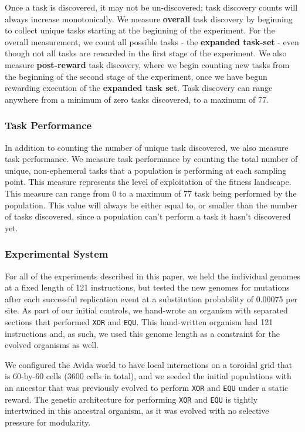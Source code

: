 \documentclass[10pt,letterpaper,final]{article}
\begin{document}
Once a task is discovered, it may not be un-discovered; task discovery counts will always increase monotonically. We measure \textbf{overall} task discovery by beginning to collect unique tasks starting at the beginning of the experiment. For the overall measurement, we count all possible tasks - the \textbf{expanded task-set} - even though not all tasks are rewarded in the first stage of the experiment. We also measure \textbf{post-reward} task discovery, where we begin counting new tasks from the beginning of the second stage of the experiment, once we have begun rewarding execution of the \textbf{expanded task set}. 
Task discovery can range anywhere from a minimum of zero tasks discovered, to a maximum of 77.

\subsubsection*{Task Performance}
In addition to counting the number of unique task discovered, we also measure task performance. We measure task performance by counting the total number of unique, non-ephemeral tasks that a population is performing at each sampling point. This measure represents the level of exploitation of the fitness landscape. This measure can range from 0 to a maximum of 77 task being performed by the population. This value will always be either equal to, or smaller than the number of tasks discovered, since a population can't perform a task it hasn't discovered yet.   

\subsubsection*{Experimental System}
For all of the experiments described in this paper, we held the individual genomes at a fixed length of 121 instructions, but tested the new genomes for mutations after each successful replication event at a substitution probability of 0.00075 per site. As part of our initial controls, we hand-wrote an organism with separated sections that performed \texttt{XOR} and \texttt{EQU}. This hand-written organism had 121 instructions and, as such, we used this genome length as a constraint for the evolved organisms as well.

We configured the Avida world to have local interactions on a toroidal grid that is 60-by-60 cells (3600 cells in total), and we seeded the initial populations with an ancestor that was previously evolved to perform \texttt{XOR} and \texttt{EQU} under a static reward. The genetic architecture for performing \texttt{XOR} and \texttt{EQU} is tightly intertwined in this ancestral organism, as it was evolved with no selective pressure for modularity.
\end{document}
